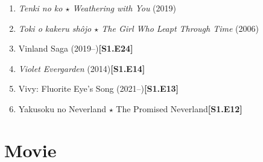 \documentclass{article}
\numberwithin{equation}{section}
\begin{document}
\begin{enumerate}
    \item \textit{Tenki no ko $\star$ Weathering with You} (2019)
    \item \textit{Toki o kakeru shôjo $\star$ The Girl Who Leapt Through Time} (2006)
    \item Vinland Saga (2019--)\hfill\textbf{[S1.E24]}
    \item \textit{Violet Evergarden} (2014)\hfill\textbf{[S1.E14]}
    \item Vivy: Fluorite Eye's Song (2021--)\hfill\textbf{[S1.E13]}
    \item Yakusoku no Neverland $\star$ The Promised Neverland\hfill\textbf{[S1.E12]}
\end{enumerate}


\section{Movie}

\end{document}
